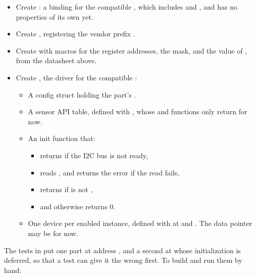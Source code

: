 \label{c5:ex:1.2}

\begin{itemize}
  \item Create : a binding for the compatible ,
    which includes  and , and has no properties of its
    own yet.
  \item Create , registering the vendor prefix .
\end{itemize}

\label{c5:ex:1.3}

\begin{itemize}
  \item Create  with macros for the register addresses, the  mask, and the
    value of , from the datasheet above.
  \item Create , the driver for the compatible :
\begin{itemize}
  \item A config struct holding the part’s .
  \item A sensor API table, defined with , whose  and
     functions only return  for now.
  \item An init function that:
\begin{itemize}
  \item returns  if the I2C bus is not ready,
  \item reads , and returns the error if the read fails,
  \item returns  if  is not ,
  \item and otherwise returns 0.
\end{itemize}
  \item One device per enabled instance, defined with  at
     and . The data pointer may be  for
    now.
\end{itemize}
\end{itemize}

The tests in  put one part at address , and a
second at  whose initialization is deferred, so that a test can give it the wrong
 first. To build and run them by hand:

